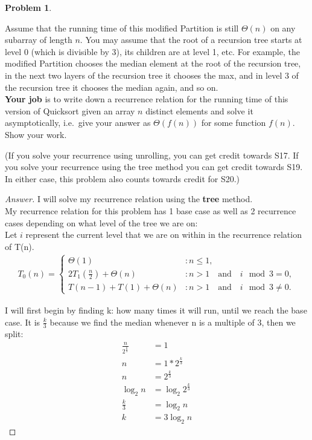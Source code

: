 \documentclass[11pt]{article}
\theoremstyle{definition}
\theoremstyle{definition}
\newtheorem{required}{Problem}
\theoremstyle{definition}
\begin{document}
\begin{required}
\begin{enumerate}[label=(\alph*)]
\noindent Assume that the running time of this modified {\sc Partition} is still $\Theta(n)$ on any subarray of length $n$. You may assume that the root of a recursion tree starts at level $0$ (which is divisible by 3), its children are at level 1, etc. For example, the modified {\sc Partition} chooses the median element at the root of the recursion tree, in the next two layers of the recursion tree it chooses the max, and in level 3 of the recursion tree it chooses the median again, and so on. \\
  
\noindent \textbf{Your job} is to write down a recurrence relation for the running time of this version of {\sc Quicksort} given an array $n$ distinct elements and solve it asymptotically, i.e.\ give your answer as $\Theta(f(n))$ for some function $f(n)$. Show your work.

\noindent (If you solve your recurrence using unrolling, you can get credit towards S17. If you solve your recurrence using the tree method you can get credit towards S19. In either case, this problem also counts towards credit for S20.)
\begin{proof}[Answer]
I will solve my recurrence relation using the \textbf{tree} method. \\
My recurrence relation for this problem has 1 base case as well as 2 recurrence cases depending on what level of the tree we are on:\\
Let $i$ represent the current level that we are on within in the recurrence relation of T(n). 
\begin{align*}
T_0(n) = \begin{cases}
\Theta(1) & : n \leq 1, \\
2T_1(\frac{n}{2}) + \Theta(n) & : n > 1 \quad \textrm{and} \quad   i\mod3 = 0, \\
T(n-1) + T(1) + \Theta(n) & : n > 1 \quad \textrm{and}  \quad i\mod 3 \neq 0.
\end{cases}
\end{align*}

I will first begin by finding k: how many times it will run, until we reach the base case. It is $\frac{k}{3}$ because we find the median whenever n is a multiple of 3, then we split: \\
\begin{align*}
\frac{n}{2^{\frac{k}{3}}} &= 1 \\
n &= 1*2^{\frac{k}{3}} \\
n&= 2^{\frac{k}{3}} \\
\log_2 n &= \log_2 2^{\frac{k}{3}} \\
\frac{k}{3} &= \log_2 n \\
k &= 3\log_2 n
\end{align*}


\end{proof}
\end{enumerate}
\end{required}
\end{document}
